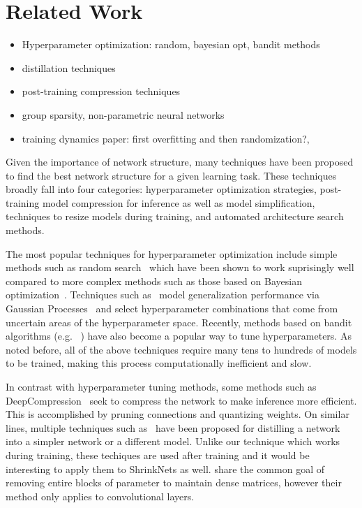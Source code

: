 \section{Related Work}

\begin{itemize}
  \item Hyperparameter optimization: random, bayesian opt, bandit methods
  \item distillation techniques
  \item post-training compression techniques
  \item group sparsity, non-parametric neural networks
  \item training dynamics paper: first overfitting and then randomization?, 
\end{itemize}

Given the importance of network structure, many techniques have been proposed
to find the best network structure for a given learning task.  These techniques
broadly fall into four categories: hyperparameter optimization strategies,
post-training model compression for inference as well as model simplification,
techniques to resize models during training, and automated architecture search
methods.

The most popular techniques for hyperparameter optimization include simple
methods such as random search~\cite{BergstraJAMESBERGSTRA2012} which have been
shown to work suprisingly well compared to more complex methods such as those
based on Bayesian optimization~\cite{Snoek12}.  Techniques such
as~\cite{Snoek12} model generalization performance via Gaussian
Processes~\cite{GaussianProcesses} and select hyperparameter combinations that
come from uncertain areas of the hyperparameter space.  Recently, methods based
on bandit algorithms (e.g. ~\cite{li2016hyperband, jamieson2016}) have also
become a popular way to tune hyperparameters.  As noted before, all of the
above techniques require many tens to hundreds of models to be trained, making
this process computationally inefficient and slow.

In contrast with hyperparameter tuning methods, some methods such as
DeepCompression~\cite{han2015deepcompression} seek to compress the network to
make inference more efficient.  This is accomplished by pruning connections and
quantizing weights.  On similar lines, multiple techniques such
as~\cite{romero2014fitnets, hinton2015distilling} have been proposed for
distilling a network into a simpler network or a different model.  Unlike our
technique which works during training, these techiques are used after training
and it would be interesting to apply them to ShrinkNets as well. \cite{Abadi2016b} share the common goal of removing entire blocks of parameter to maintain dense matrices, however their method only applies to convolutional layers.

